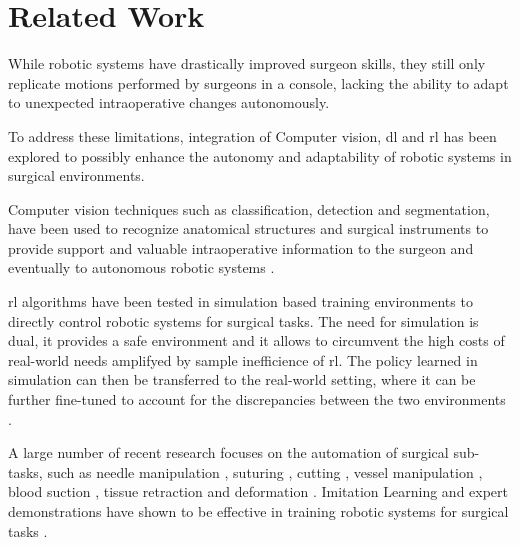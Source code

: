 

\section{Related Work}

While robotic systems have drastically improved surgeon skills, they still 
only replicate motions performed by surgeons in a console, lacking the 
ability to adapt to unexpected intraoperative changes autonomously. 

To address these limitations, integration of
Computer vision, \gls{dl} and \gls{rl} has been explored to possibly enhance the 
autonomy and adaptability of robotic systems in surgical environments.

Computer vision techniques such as classification, detection and segmentation, have been used to recognize anatomical structures
and surgical instruments to provide support and valuable intraoperative information 
to the surgeon and eventually to autonomous robotic systems 
\citep{AMPARORE2022e312, cancers16051047}. 

\gls{rl} algorithms have been tested in simulation based training 
environments to directly control robotic systems for surgical tasks. 
The need for simulation is dual, it provides a safe environment
and it allows to circumvent the high costs of real-world needs amplifyed 
by sample inefficience of \gls{rl}. 
The policy learned in simulation can then be transferred to the real-world setting, 
where it can be further fine-tuned to account for the discrepancies between 
the two environments \citep{10065553}.


A large number of recent research focuses on the automation of surgical sub-tasks, 
such as needle manipulation \citep{10100702}, suturing \citep{9223543}, cutting \citep{Shahkoo2023},
vessel manipulation \citep{10160966}, blood suction \citep{10578312}, tissue retraction and
deformation \citep{9976185}. Imitation Learning and expert demonstrations have shown to be effective in
training robotic systems for surgical tasks \citep{kim2024surgicalrobottransformersrt}.



